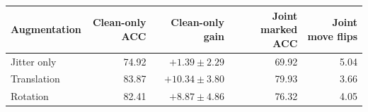 \begin{tabular}{lrrrr}
\toprule
Augmentation & Clean-only ACC & Clean-only gain & Joint marked ACC & Joint move flips\\
\midrule
Jitter only & 74.92 & $+1.39\pm2.29$ & 69.92 & 5.04\\
Translation & 83.87 & $+10.34\pm3.80$ & 79.93 & 3.66\\
Rotation & 82.41 & $+8.87\pm4.86$ & 76.32 & 4.05\\
\bottomrule
\end{tabular}
